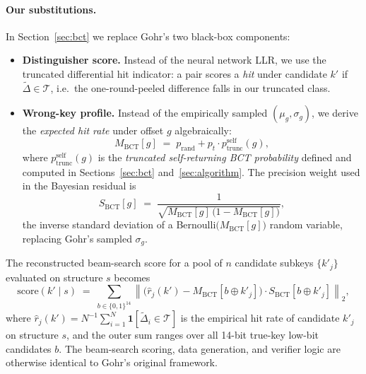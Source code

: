 \documentclass[runningheads]{llncs}
\newcommand{\pself}{p^{\mathrm{self}}_{\mathrm{trunc}}}
\newcommand{\xor}{\oplus}
\begin{document}
\paragraph{Our substitutions.}
In Section~\ref{sec:bct} we replace Gohr's two black-box components:
\begin{itemize}
  \item \textbf{Distinguisher score.}
    Instead of the neural network LLR, we use the truncated differential
    hit indicator: a pair scores a \emph{hit} under candidate $k'$ if
    $\widetilde{\Delta} \in \mathcal{T}$, i.e.\ the one-round-peeled
    difference falls in our truncated class.

  \item \textbf{Wrong-key profile.}
    Instead of the empirically sampled $(\mu_g, \sigma_g)$, we derive
    the \emph{expected hit rate} under offset $g$ algebraically:
    \begin{equation}
      \label{eq:wkp-ours}
      M_{\mathrm{BCT}}[g]
      \;=\;
      p_{\mathrm{rand}} + p_t \cdot \pself(g),
    \end{equation}
    where $\pself(g)$ is the \emph{truncated self-returning BCT
    probability} defined and computed in Sections~\ref{sec:bct}
    and~\ref{sec:algorithm}.
    The precision weight used in the Bayesian residual is
    \begin{equation}
      \label{eq:wkp-weight}
      S_{\mathrm{BCT}}[g]
      \;=\;
      \frac{1}{\sqrt{M_{\mathrm{BCT}}[g]\,\bigl(1 - M_{\mathrm{BCT}}[g]\bigr)}},
    \end{equation}
    the inverse standard deviation of a Bernoulli$\bigl(M_{\mathrm{BCT}}[g]\bigr)$
    random variable, replacing Gohr's sampled $\sigma_g$.
\end{itemize}

The reconstructed beam-search score for a pool of $n$ candidate subkeys
$\{k'_j\}$ evaluated on structure $s$ becomes
\begin{equation}
  \label{eq:our-score}
  \mathrm{score}(k' \mid s)
  \;=\;
  \sum_{b \in \{0,1\}^{14}}
  \left\lVert
    \bigl(\hat{r}_j(k') - M_{\mathrm{BCT}}[b \xor k'_j]\bigr)
    \cdot S_{\mathrm{BCT}}[b \xor k'_j]
  \right\rVert_2,
\end{equation}
where $\hat{r}_j(k') = N^{-1}\sum_{i=1}^N \mathbf{1}[\widetilde{\Delta}_i \in \mathcal{T}]$
is the empirical hit rate of candidate $k'_j$ on structure $s$, and the
outer sum ranges over all 14-bit true-key low-bit candidates $b$.  The
beam-search scoring, data generation, and verifier logic are otherwise
identical to Gohr's original framework.
\end{document}
